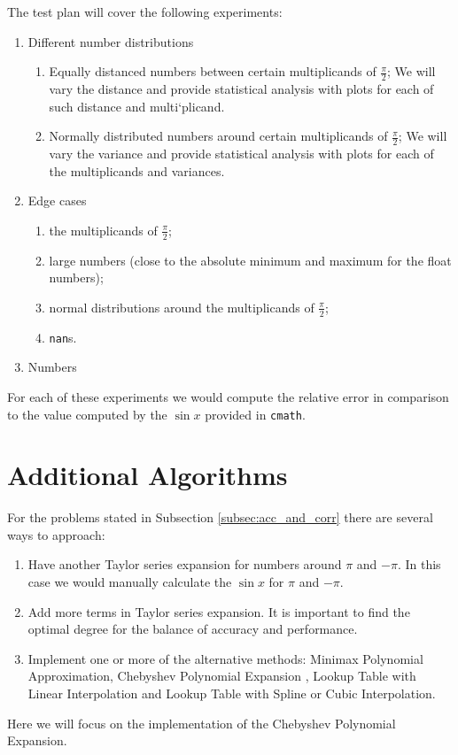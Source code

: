 \documentclass[12pt]{article}
\begin{document}
The test plan will cover the following experiments:
\begin{enumerate}
    \item Different number distributions
    \begin{enumerate}
        \item Equally distanced numbers between certain multiplicands of $\frac{\pi}{2}$; We will vary the distance and provide statistical analysis with plots for each of such distance and multi`plicand.
        \item Normally distributed numbers around certain multiplicands of $\frac{\pi}{2}$; We will vary the variance and provide statistical analysis with plots for each of the multiplicands and variances.
    \end{enumerate}
    \item Edge cases
        \begin{enumerate}
            \item the multiplicands of $\frac{\pi}{2}$;
            \item large numbers (close to the absolute minimum  and maximum for the float numbers);
            \item normal distributions around the multiplicands of $\frac{\pi}{2}$;
            \item \texttt{nan}s.
        \end{enumerate}
    \item Numbers
\end{enumerate}
For each of these experiments we would compute the relative error in comparison to the value computed by the $\sin x$ provided in \texttt{cmath}.

\section{Additional Algorithms}
For the problems stated in Subsection \ref{subsec:acc_and_corr} there are several ways to approach:
\begin{enumerate}
    \item Have another Taylor series expansion for numbers around $\pi$ and $-\pi$. In this case we would manually calculate the $\sin x$ for $\pi$ and $-\pi$.
    \item  Add more terms in Taylor series expansion. It is important to find the optimal degree for the balance of accuracy and performance.
    \item Implement one or more of the alternative methods: Minimax Polynomial Approximation, Chebyshev Polynomial Expansion \cite{press2007numerical}, Lookup Table with Linear Interpolation and Lookup Table with Spline or Cubic Interpolation.
\end{enumerate}
Here we will focus on the implementation of the Chebyshev Polynomial Expansion.
\end{document}
